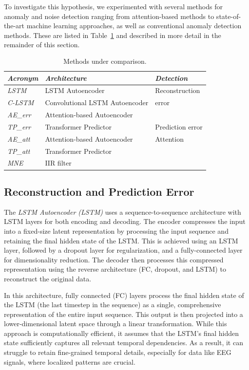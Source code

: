 \documentclass[runningheads]{llncs}
\begin{document}
To investigate this hypothesis, we experimented with several methods
for anomaly and noise detection ranging from attention-based methods
to state-of-the-art machine learning approaches, as well as
conventional anomaly detection methods. These are listed in
Table~\ref{tab1} and described in more detail in the remainder of this
section.


\begin{table}[bt]
\centering
\caption{Methods under comparison.}
\label{tab1}
\begin{tabular}{lp{4cm}p{2cm}}
\toprule
\emph{Acronym}   & \emph{Architecture}& \emph{Detection}  \\
\midrule
\textit{LSTM}    & LSTM Autoencoder   & Reconstruction  \\
\textit{C-LSTM}  & Convolutional LSTM Autoencoder
                                      & error  \\
\textit{AE\_err} & Attention-based Autoencoder
                                      &   \\
\midrule
\textit{TP\_err} & Transformer Predictor
                                      & Prediction error  \\
\midrule
\textit{AE\_att} & Attention-based Autoencoder
                                      & Attention \\
\textit{TP\_att} & Transformer Predictor &  \\
\midrule
\textit{MNE}     & \multicolumn{2}{l}{IIR filter} \\
\bottomrule
\end{tabular} 
\end{table}


\subsection{Reconstruction and Prediction Error}

The \emph{LSTM Autoencoder (LSTM)} uses a sequence-to-sequence
architecture with LSTM layers for both encoding and decoding. The
encoder compresses the input into a fixed-size latent representation
by processing the input sequence and retaining the final hidden state
of the LSTM. This is achieved using an LSTM layer, followed by a
dropout layer for regularization, and a fully-connected layer for
dimensionality reduction. The decoder then processes this compressed
representation using the reverse architecture (FC, dropout, and LSTM)
to reconstruct the original data.

In this architecture, fully connected (FC) layers process the final
hidden state of the LSTM (the last timestep in the sequence) as a
single, comprehensive representation of the entire input
sequence. This output is then projected into a lower-dimensional
latent space through a linear transformation. While this approach is
computationally efficient, it assumes that the LSTM's final hidden
state sufficiently captures all relevant temporal dependencies. As a
result, it can struggle to retain fine-grained temporal details,
especially for data like EEG signals, where localized patterns are
crucial.
\end{document}

